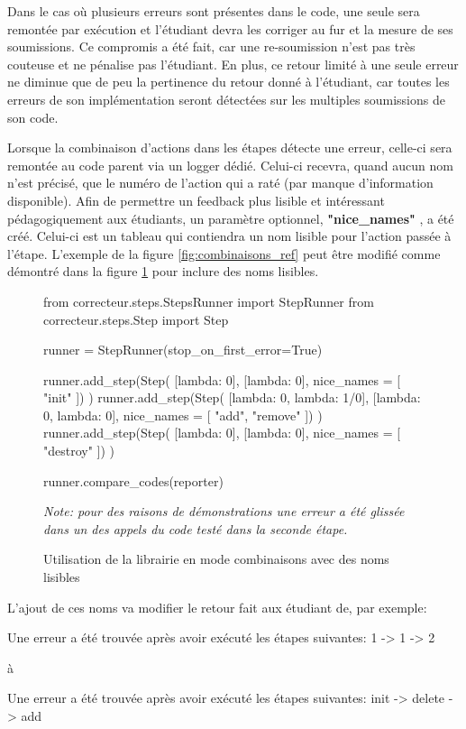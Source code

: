 \documentclass[a4paper]{report}
\begin{document}
Dans le cas où plusieurs erreurs sont présentes dans le code, une seule sera remontée par exécution et l'étudiant devra les corriger au fur et la mesure de ses soumissions.
Ce compromis a été fait, car une re-soumission n'est pas très couteuse et ne pénalise pas l'étudiant.
En plus, ce retour limité à une seule erreur ne diminue que de peu la pertinence du retour donné à l'étudiant, car toutes les erreurs de son implémentation seront détectées sur les multiples soumissions de son code.
  

Lorsque la combinaison d'actions dans les étapes détecte une erreur, celle-ci sera remontée au code parent via un logger dédié.
Celui-ci recevra, quand aucun nom n'est précisé, que le numéro de l'action qui a raté (par manque d'information disponible).
Afin de permettre un feedback plus lisible et intéressant pédagogiquement aux étudiants, un paramètre optionnel, \textbf{"nice\_names"} , a été créé.
Celui-ci est un tableau qui contiendra un nom lisible pour l’action passée à l'étape.
L'exemple de la figure \ref{fig:combinaisons_ref} peut être modifié comme démontré dans la figure \ref{fig:combinaisons_ref_name} pour inclure des noms lisibles.

\begin{figure}[ht]
\begin{python}
from correcteur.steps.StepsRunner import StepRunner
from correcteur.steps.Step import Step

runner = StepRunner(stop_on_first_error=True)

runner.add_step(Step(
	[lambda: 0],
	[lambda: 0],
	nice_names = [
		"init"
	])
)
runner.add_step(Step(
	[lambda: 0, lambda: 1/0],
	[lambda: 0, lambda: 0],
	nice_names = [
		"add",
		"remove"
	])
)
runner.add_step(Step(
	[lambda: 0],
	[lambda: 0],
	nice_names = [
		"destroy"
	])
)

runner.compare_codes(reporter)
\end{python}
	\caption{Utilisation de la librairie en mode combinaisons avec des noms lisibles}
	
	\textit{Note: pour des raisons de démonstrations une erreur a été glissée dans un des appels du code testé dans la seconde étape.}
	
	\label{fig:combinaisons_ref_name}
\end{figure}

L'ajout de ces noms va modifier le retour fait aux étudiant de, par exemple:
\begin{center}
Une erreur a été trouvée après avoir exécuté les étapes suivantes: 1 -> 1 -> 2
\end{center}
à
\begin{center}
Une erreur a été trouvée après avoir exécuté les étapes suivantes: init -> delete -> add
\end{center}
\end{document}
